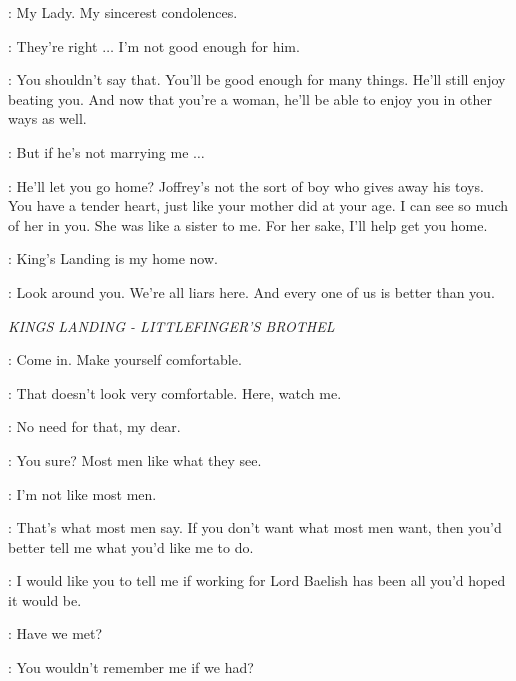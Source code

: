 \LITTLEFINGER: My Lady. My sincerest condolences. 

\SANSA: They're right $\ldots$ I'm not good enough for him. 

\LITTLEFINGER: You shouldn't say that. You'll be good enough for many things. He'll still enjoy beating you. And now that you're a woman, he'll be able to enjoy you in other ways as well. 

\SANSA: But if he's not marrying me $\ldots$  

\LITTLEFINGER: He'll let you go home? Joffrey's not the sort of boy who gives away his toys. You have a tender heart, just like your mother did at your age. I can see so much of her in you. She was like a sister to me. For her sake, I'll help get you home. 

\SANSA: King's Landing is my home now. 

\LITTLEFINGER: Look around you. We're all liars here. And every one of us is better than you. 


\scene

\textit{KINGS LANDING - LITTLEFINGER'S BROTHEL} 


\ROS: Come in. Make yourself comfortable. 


\ROS: That doesn't look very comfortable. Here, watch me. 


\VARYS: No need for that, my dear. 

\ROS: You sure? Most men like what they see. 

\VARYS: I'm not like most men. 

\ROS: That's what most men say.  If you don't want what most men want, then you'd better tell me what you'd like me to do. 

\VARYS: I would like you to tell me if working for Lord Baelish has been all you'd hoped it would be. 

\ROS: Have we met? 

\VARYS: You wouldn't remember me if we had? 

